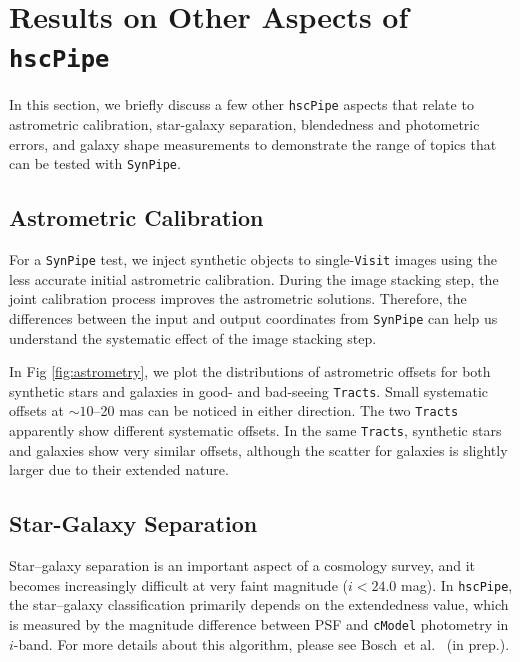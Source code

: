 \documentclass[useamsfonts]{pasj01}
\def\etal{{\ et al.~}}
\def\hscpipe{\texttt{hscPipe}}
\def\synpipe{\texttt{SynPipe}}
\def\cmodel{\texttt{cModel}}
\def\visit{\texttt{Visit}}
\def\tracts{\texttt{Tracts}}
\begin{document}

\section{Results on Other Aspects of \hscpipe{}}
    \label{sec:others}

    In this section, we briefly discuss a few other  \hscpipe{} aspects that relate
    to astrometric calibration, star-galaxy separation, blendedness and photometric errors, and galaxy shape measurements to demonstrate the range of topics that can be tested with \synpipe{}.

\subsection{Astrometric Calibration}
    \label{ssec:astrometry}

    For a \synpipe{} test, we inject synthetic objects to single-\visit{} images using
    the less accurate initial astrometric calibration.
    During the image stacking step, the joint calibration process  improves the
    astrometric solutions.
    Therefore, the differences between the input and output coordinates from \synpipe{}
    can help us understand the systematic effect of the image stacking step.

    In Fig \ref{fig:astrometry}, we plot the distributions of astrometric offsets for
    both synthetic stars and galaxies in good- and bad-seeing \tracts{}.
    Small systematic offsets at ${\sim}10$--20 mas can be noticed in either direction.
    The two \tracts{} apparently show different systematic offsets.
    In the same \tracts{}, synthetic stars and galaxies show very similar offsets,
    although the scatter for galaxies is slightly larger due to their extended nature.

\subsection{Star-Galaxy Separation}
    \label{ssec:sg}

    Star--galaxy separation is an important aspect of a cosmology survey,
    and it becomes increasingly difficult at very faint magnitude ($i<24.0$ mag).
    In \hscpipe{}, the star--galaxy classification primarily depends on the extendedness
    value, which is measured by the magnitude difference between PSF and \cmodel{}
    photometry in $i$-band.
    For more details about this algorithm, please see Bosch\etal
    (in prep.).
\end{document}
